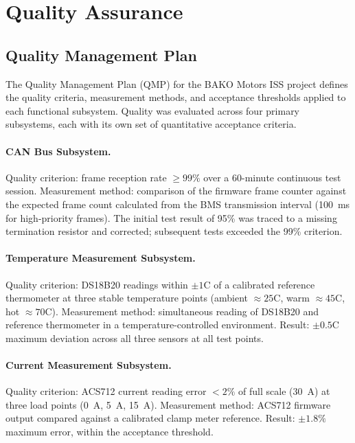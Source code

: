 \section{Quality Assurance}

\subsection{Quality Management Plan}

The Quality Management Plan (QMP) for the BAKO Motors ISS project defines the quality criteria, measurement methods, and acceptance thresholds applied to each functional subsystem. Quality was evaluated across four primary subsystems, each with its own set of quantitative acceptance criteria.

\paragraph{CAN Bus Subsystem.}
Quality criterion: frame reception rate $\geq 99\%$ over a 60-minute continuous test session. Measurement method: comparison of the firmware frame counter against the expected frame count calculated from the BMS transmission interval (100~ms for high-priority frames). The initial test result of 95\% was traced to a missing termination resistor and corrected; subsequent tests exceeded the 99\% criterion.

\paragraph{Temperature Measurement Subsystem.}
Quality criterion: DS18B20 readings within $\pm 1$\textdegree{}C of a calibrated reference thermometer at three stable temperature points (ambient $\approx 25$\textdegree{}C, warm $\approx 45$\textdegree{}C, hot $\approx 70$\textdegree{}C). Measurement method: simultaneous reading of DS18B20 and reference thermometer in a temperature-controlled environment. Result: $\pm 0.5$\textdegree{}C maximum deviation across all three sensors at all test points.

\paragraph{Current Measurement Subsystem.}
Quality criterion: ACS712 current reading error $< 2\%$ of full scale (30~A) at three load points (0~A, 5~A, 15~A). Measurement method: ACS712 firmware output compared against a calibrated clamp meter reference. Result: $\pm 1.8\%$ maximum error, within the acceptance threshold.

